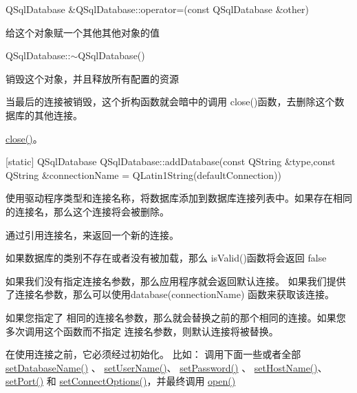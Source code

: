 QSqlDatabase \&QSqlDatabase::operator=(const QSqlDatabase \&other)

给这个对象赋一个其他其他对象的值

QSqlDatabase::$\sim$QSqlDatabase()

销毁这个对象，并且释放所有配置的资源 

\begin{notice}
当最后的连接被销毁，这个折构函数就会暗中的调用 close()函数，去删除这个数据库的其他连接。
\end{notice}

\begin{seeAlso}
\href{https://github.com/QtDocumentCN/QtDocumentCN/blob/master/Src/S/QSqlDatabase/QSqlDatabase.md#void-qsqldatabaseclose}{close()}。
\end{seeAlso}



[static] QSqlDatabase QSqlDatabase::addDatabase(const QString \&type,const QString \&connectionName = QLatin1String(defaultConnection))

使用驱动程序类型和连接名称，将数据库添加到数据库连接列表中。如果存在相同的连接名，那么这个连接将会被删除。

通过引用连接名，来返回一个新的连接。

如果数据库的类别不存在或者没有被加载，那么 isValid()函数将会返回 false

如果我们没有指定连接名参数，那么应用程序就会返回默认连接。 如果我们提供了连接名参数，那么可以使用database(connectionName) 函数来获取该连接。

\begin{warning}
如果您指定了 相同的连接名参数，那么就会替换之前的那个相同的连接。如果您多次调用这个函数而不指定 连接名参数，则默认连接将被替换。
\end{warning}


在使用连接之前，它必须经过初始化。
比如： 调用下面一些或者全部 \href{https://github.com/QtDocumentCN/QtDocumentCN/blob/master/Src/S/QSqlDatabase/QSqlDatabase.md#void-qsqldatabasesetdatabasenameconst-qstring-name}{setDatabaseName()} 、 \href{https://github.com/QtDocumentCN/QtDocumentCN/blob/master/Src/S/QSqlDatabase/QSqlDatabase.md#void-qsqldatabasesetusernameconst-qstring-name}{setUserName()}、 \href{https://github.com/QtDocumentCN/QtDocumentCN/blob/master/Src/S/QSqlDatabase/QSqlDatabase.md#void-qsqldatabasesetpasswordconst-qstring-password}{setPassword()} 、 \href{https://github.com/QtDocumentCN/QtDocumentCN/blob/master/Src/S/QSqlDatabase/QSqlDatabase.md#void-qsqldatabasesethostnameconst-qstring-host}{setHostName()}、 \href{https://github.com/QtDocumentCN/QtDocumentCN/blob/master/Src/S/QSqlDatabase/QSqlDatabase.md#void-qsqldatabasesetportint-port}{setPort()} 和 \href{https://github.com/QtDocumentCN/QtDocumentCN/blob/master/Src/S/QSqlDatabase/QSqlDatabase.md#void-qsqldatabasesetconnectoptionsconst-qstring-options--qstring}{setConnectOptions()}，并最终调用 \href{https://github.com/QtDocumentCN/QtDocumentCN/blob/master/Src/S/QSqlDatabase/QSqlDatabase.md#bool-qsqldatabaseopen}{open()}



